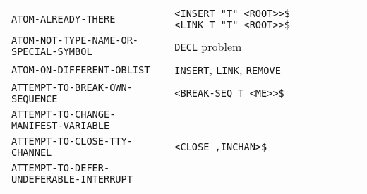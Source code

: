 \documentclass[a4paper]{scrbook}
\begin{document}
\begin{longtable}[]{@{}ll@{}}
\begin{minipage}[t]{0.58\columnwidth}
\texttt{ATOM-ALREADY-THERE}\strut
\end{minipage} & \begin{minipage}[t]{0.36\columnwidth}\raggedright\strut
\texttt{\textless{}INSERT\ "T"\ \textless{}ROOT\textgreater{}\textgreater{}\$}
\texttt{\textless{}LINK\ \textquotesingle{}T\ "T"\ \textless{}ROOT\textgreater{}\textgreater{}\$}\strut
\end{minipage}\tabularnewline
\begin{minipage}[t]{0.58\columnwidth}\raggedright\strut
\texttt{ATOM-NOT-TYPE-NAME-OR-SPECIAL-SYMBOL}\strut
\end{minipage} & \begin{minipage}[t]{0.36\columnwidth}\raggedright\strut
\texttt{DECL} problem\strut
\end{minipage}\tabularnewline
\begin{minipage}[t]{0.58\columnwidth}\raggedright\strut
\texttt{ATOM-ON-DIFFERENT-OBLIST}\strut
\end{minipage} & \begin{minipage}[t]{0.36\columnwidth}\raggedright\strut
\texttt{INSERT}, \texttt{LINK}, \texttt{REMOVE}\strut
\end{minipage}\tabularnewline
\begin{minipage}[t]{0.58\columnwidth}\raggedright\strut
\texttt{ATTEMPT-TO-BREAK-OWN-SEQUENCE}\strut
\end{minipage} & \begin{minipage}[t]{0.36\columnwidth}\raggedright\strut
\texttt{\textless{}BREAK-SEQ\ T\ \textless{}ME\textgreater{}\textgreater{}\$}\strut
\end{minipage}\tabularnewline
\begin{minipage}[t]{0.58\columnwidth}\raggedright\strut
\texttt{ATTEMPT-TO-CHANGE-MANIFEST-VARIABLE}\strut
\end{minipage} & \begin{minipage}[t]{0.36\columnwidth}\raggedright\strut
\strut
\end{minipage}\tabularnewline
\begin{minipage}[t]{0.58\columnwidth}\raggedright\strut
\texttt{ATTEMPT-TO-CLOSE-TTY-CHANNEL}\strut
\end{minipage} & \begin{minipage}[t]{0.36\columnwidth}\raggedright\strut
\texttt{\textless{}CLOSE\ ,INCHAN\textgreater{}\$}\strut
\end{minipage}\tabularnewline
\begin{minipage}[t]{0.58\columnwidth}\raggedright\strut
\texttt{ATTEMPT-TO-DEFER-UNDEFERABLE-INTERRUPT}\strut

\end{minipage}
\end{longtable}
\end{document}
